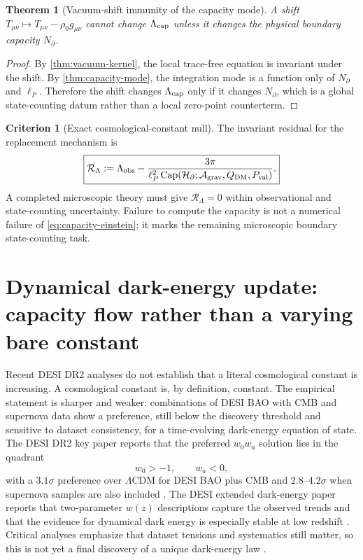 \documentclass[aps,prd,reprint,nofootinbib,superscriptaddress,floatfix]{revtex4-2}
\numberwithin{equation}{section}
\theoremstyle{definition}
\newtheorem{criterion}{Criterion}[section]
\theoremstyle{plain}
\newtheorem{theorem}{Theorem}[section]
\newcommand{\Agrav}{\mathcal A_{\rm grav}}
\newcommand{\Ncap}{N_{\partial}}
\newcommand{\Capacity}{\operatorname{Cap}}
\begin{document}
\begin{theorem}[Vacuum-shift immunity of the capacity mode]\label{thm:vacuum-shift-immunity}
A shift \(T_{\mu\nu}\mapsto T_{\mu\nu}-\rho_0g_{\mu\nu}\) cannot change \(\Lambda_{\rm cap}\) unless it changes the physical boundary capacity \(\Ncap\).
\end{theorem}

\begin{proof}
By \cref{thm:vacuum-kernel}, the local trace-free equation is invariant under the shift.  By \cref{thm:capacity-mode}, the integration mode is a function only of \(\Ncap\) and \(\ell_P\).  Therefore the shift changes \(\Lambda_{\rm cap}\) only if it changes \(\Ncap\), which is a global state-counting datum rather than a local zero-point counterterm.
\end{proof}

\begin{criterion}[Exact cosmological-constant null]\label{crit:lambda-null}
The invariant residual for the replacement mechanism is
\begin{equation}
\boxed{
\mathcal R_\Lambda
:=
\Lambda_{\rm obs}
-
\frac{3\pi}
{\ell_P^2\Capacity(\mathcal H_\partial;\Agrav,Q_{\rm DM},P_{\rm val})}.
}
\end{equation}
A completed microscopic theory must give \(\mathcal R_\Lambda=0\) within observational and state-counting uncertainty.  Failure to compute the capacity is not a numerical failure of \eqref{eq:capacity-einstein}; it marks the remaining microscopic boundary state-counting task.
\end{criterion}


\section{Dynamical dark-energy update: capacity flow rather than a varying bare constant}\label{sec:dynamic-capacity}

Recent DESI DR2 analyses do not establish that a literal cosmological constant is increasing.  A cosmological constant is, by definition, constant.  The empirical statement is sharper and weaker: combinations of DESI BAO with CMB and supernova data show a preference, still below the discovery threshold and sensitive to dataset consistency, for a time-evolving dark-energy equation of state.  The DESI DR2 key paper reports that the preferred \(w_0w_a\) solution lies in the quadrant
\[
w_0>-1,\qquad w_a<0,
\]
with a \(3.1\sigma\) preference over \(\Lambda\)CDM for DESI BAO plus CMB and \(2.8\)--\(4.2\sigma\) when supernova samples are also included \cite{DESIDR2BAO2025}.  The DESI extended dark-energy paper reports that two-parameter \(w(z)\) descriptions capture the observed trends and that the evidence for dynamical dark energy is especially stable at low redshift \cite{DESIDR2Extended2025}.  Critical analyses emphasize that dataset tensions and systematics still matter, so this is not yet a final discovery of a unique dark-energy law \cite{WangMota2025}.
\end{document}
